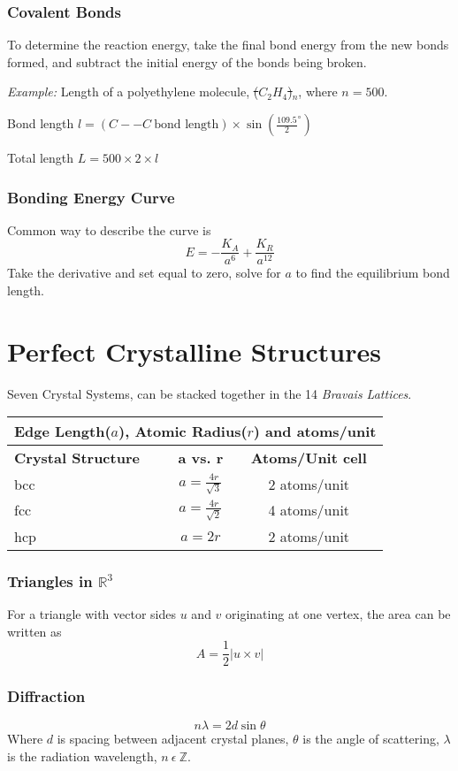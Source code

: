 \documentclass[10pt,letterpaper]{article}
\begin{document}
	\subsubsection*{Covalent Bonds}
	To determine the reaction energy, take the final bond energy from the new bonds formed, and subtract the initial energy of the bonds being broken. 
	
	\textit{Example: } Length of a polyethylene molecule, \st{(}$C_2H_4$\st{)}$_n$, where $n = 500$. 
	
	Bond length $l = (C -- C \: \text{bond length}) \times \sin(\frac{109.5}{2}^{\circ})$
	
	Total length $L = 500 \times 2 \times l$
	\subsubsection*{Bonding Energy Curve}
	Common way to describe the curve is 
	$$
	E = -\frac{K_A}{a^6} + \frac{K_R}{a^{12}}
	$$
	Take the derivative and set equal to zero, solve for $a$ to find the equilibrium bond length. 
	
	\section{Perfect Crystalline Structures}
	Seven Crystal Systems, can be stacked together in the 14 \textit{Bravais Lattices}.
	\begin{tabular}{|l|c|c|}
		\hline 
		\multicolumn{3}{|l|}{Edge Length($a$), Atomic Radius($r$) and atoms/unit} \\ 
		\hline 
		\textbf{Crystal Structure} & \textbf{a vs. r} & \textbf{Atoms/Unit cell}\\ 
		\hline 
		bcc & $a=\frac{4r}{\sqrt{3}}$ & 2 atoms/unit\\ 
		\hline 
		fcc & $a=\frac{4r}{\sqrt{2}}$  & 4 atoms/unit\\ 
		\hline 
		hcp & $a=2r$ & 2 atoms/unit\\ 
		\hline 
	\end{tabular} 
	
	\subsubsection*{Triangles in $\mathbb{R}^3$}
	For a triangle with vector sides $u$ and $v$ originating at one vertex, the area can be written as 
	$$
	A = \frac{1}{2} | u \times v |
	$$
	\subsubsection*{Diffraction}
	$$
	n \lambda = 2d \sin \theta
	$$
	Where $d$ is spacing between adjacent crystal planes, $\theta$ is the angle of scattering, $\lambda$ is the radiation wavelength, $n \: \epsilon \: \mathbb{Z}$.
\end{document}
